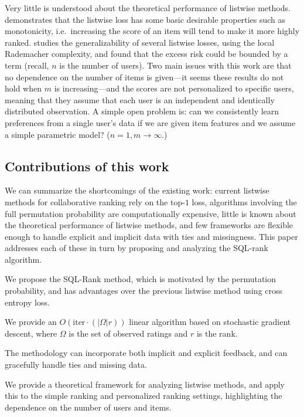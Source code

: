 \documentclass{article}
\begin{document}
Very little is understood about the theoretical performance of listwise methods.  
\cite{cao2007learning} demonstrates that the listwise loss has some basic desirable properties such as monotonicity, i.e.~increasing the score of an item will tend to make it more highly ranked.
\cite{lan2009generalization} studies the generalizability of several listwise losses, using the local Rademacher complexity, and found that the excess risk could be bounded by a  term (recall, $n$ is the number of users).
Two main issues with this work are that no dependence on the number of items is given---it seems these results do not hold when $m$ is increasing---and the scores are not personalized to specific users, meaning that they assume that each user is an independent and identically distributed observation.
A simple open problem is: can we consistently learn preferences from a single user's data if we are given item features and we assume a simple parametric model?  ($n = 1, m\rightarrow \infty$.)

\subsection{Contributions of this work}

We can summarize the shortcomings of the existing work: current listwise methods for collaborative ranking rely on the top-$1$ loss, algorithms involving the full permutation probability are computationally expensive, little is known about the theoretical performance of listwise methods, and few frameworks are flexible enough to handle explicit and implicit data with ties and missingness.
This paper addresses each of these in turn by proposing and analyzing the SQL-rank algorithm.

\begin{compactitem}
    \item We propose the SQL-Rank method, which is motivated by the permutation probability, and has advantages over the previous listwise method using cross entropy loss. 
    \item We provide an $O(\text{iter} \cdot (|\Omega| r))$ linear algorithm based on stochastic gradient descent, where $\Omega$ is the set of observed ratings and $r$ is the rank.
    \item The methodology can incorporate both implicit and explicit feedback, and can gracefully handle ties and missing data.
    \item We provide a theoretical framework for analyzing listwise methods, and apply this to the simple ranking and personalized ranking settings, highlighting the dependence on the number of users and items.
\end{compactitem}
\end{document}
